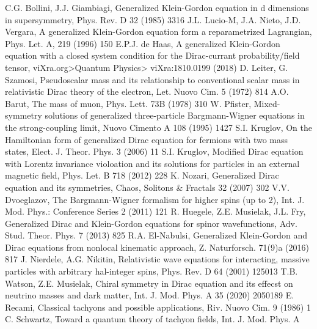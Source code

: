 \documentclass[12pt]{iopart}
\begin{document}
\begin{thebibliography}{}
 C.G. Bollini, J.J. Giambiagi, Generalized Klein-Gordon equation in 
                    d dimensions in supersymmetry, Phys. Rev. D 32 (1985) 3316
 J.L. Lucio-M, J.A. Nieto, J.D. Vergara, A generalized Klein-Gordon
                   equation form a reparametrized Lagrangian, Phys. Let. A, 219 (1996) 150
 E.P.J. de Haas, A generalized Klein-Gordon equation with a closed system
                    condition for the Dirac-currant probability/field tensor, viXra.org>Quantum 
                    Physics> viXra:1810.0199 (2018)
 D. Leiter, G. Szamosi, Pseudoscalar mass and its relationship to conventional scalar
                   mass in relativistic Dirac theory of the electron, Let. Nuovo Cim. 5 (1972) 814
 A.O. Barut, The mass of muon, Phys. Lett. 73B (1978) 310
 W. Pfister, Mixed-symmetry solutions of generalized three-particle Bargmann-Wigner
                    equations in the strong-coupling limit, Nuovo Cimento A 108 (1995) 1427
 S.I. Kruglov, On the Hamiltonian form of generalized Dirac equation for 
                    fermions with two mass states, Elect. J. Theor. Phys. 3 (2006) 11
 S.I. Kruglov, Modified Dirac equation with Lorentz invariance violoation
                   and its solutions for particles in an external magnetic field, 
                   Phys. Let. B  718 (2012) 228
 K. Nozari, Generalized Dirac equation and its symmetries, 
                   Chaos, Solitons \& Fractals 32 (2007) 302
 V.V. Dvoeglazov, The Bargmann-Wigner formalism for higher spins
                   (up to 2), Int. J. Mod. Phys.: Conference Series 2 (2011) 121
 R. Huegele, Z.E. Musielak, J.L. Fry, Generalized Dirac and Klein-Gordon 
                   equations for spinor wavefunctions, Adv. Stud. Theor. Phys. 7 (2013) 825
 R.A. El-Nabulsi, Generalized Klein-Gordon and Dirac equations from 
                    nonlocal kinematic approach, Z. Naturforsch. 71(9)a (2016) 817
 J. Nierdele, A.G. Nikitin, Relativistic wave equations for interacting, 
                    massive particles with arbitrary hal-integer spins, Phys. Rev. D 64 
                    (2001) 125013 
 T.B. Watson, Z.E. Musielak, Chiral symmetry in Dirac equation and 
                    its effecst on neutrino masses and dark matter, Int. J. Mod. Phys. A 
                    35 (2020) 2050189
 E. Recami, Classical tachyons and possible applications, Riv. Nuovo Cim.
                    9 (1986) 1
 C. Schwartz, Toward a quantum theory of tachyon fields, Int. J. Mod. Phys. A 

\end{thebibliography}
\end{document}
